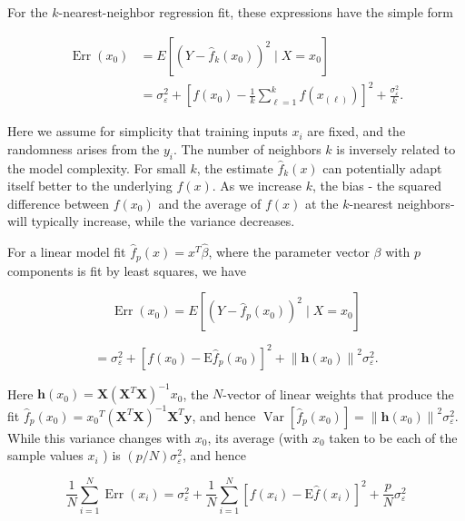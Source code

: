 \documentclass[10pt]{article}
\begin{document}
For the $k$-nearest-neighbor regression fit, these expressions have the simple form


\begin{align*}
\operatorname{Err}\left(x_{0}\right) & =E\left[\left(Y-\hat{f}_{k}\left(x_{0}\right)\right)^{2} \mid X=x_{0}\right] \\
& =\sigma_{\varepsilon}^{2}+\left[f\left(x_{0}\right)-\frac{1}{k} \sum_{\ell=1}^{k} f\left(x_{(\ell)}\right)\right]^{2}+\frac{\sigma_{\varepsilon}^{2}}{k} . \tag{7.10}
\end{align*}


Here we assume for simplicity that training inputs $x_{i}$ are fixed, and the randomness arises from the $y_{i}$. The number of neighbors $k$ is inversely related to the model complexity. For small $k$, the estimate $\hat{f}_{k}(x)$ can potentially adapt itself better to the underlying $f(x)$. As we increase $k$, the bias - the squared difference between $f\left(x_{0}\right)$ and the average of $f(x)$ at the $k$-nearest neighbors-will typically increase, while the variance decreases.

For a linear model fit $\hat{f}_{p}(x)=x^{T} \hat{\beta}$, where the parameter vector $\beta$ with $p$ components is fit by least squares, we have

$$
\operatorname{Err}\left(x_{0}\right)=E\left[\left(Y-\hat{f}_{p}\left(x_{0}\right)\right)^{2} \mid X=x_{0}\right]
$$


\begin{equation*}
=\sigma_{\varepsilon}^{2}+\left[f\left(x_{0}\right)-\mathrm{E} \hat{f}_{p}\left(x_{0}\right)\right]^{2}+\left\|\mathbf{h}\left(x_{0}\right)\right\|^{2} \sigma_{\varepsilon}^{2} . \tag{7.11}
\end{equation*}


Here $\mathbf{h}\left(x_{0}\right)=\mathbf{X}\left(\mathbf{X}^{T} \mathbf{X}\right)^{-1} x_{0}$, the $N$-vector of linear weights that produce the fit $\hat{f}_{p}\left(x_{0}\right)=x_{0}{ }^{T}\left(\mathbf{X}^{T} \mathbf{X}\right)^{-1} \mathbf{X}^{T} \mathbf{y}$, and hence $\operatorname{Var}\left[\hat{f}_{p}\left(x_{0}\right)\right]=\left\|\mathbf{h}\left(x_{0}\right)\right\|^{2} \sigma_{\varepsilon}^{2}$. While this variance changes with $x_{0}$, its average (with $x_{0}$ taken to be each of the sample values $x_{i}$ ) is $(p / N) \sigma_{\varepsilon}^{2}$, and hence


\begin{equation*}
\frac{1}{N} \sum_{i=1}^{N} \operatorname{Err}\left(x_{i}\right)=\sigma_{\varepsilon}^{2}+\frac{1}{N} \sum_{i=1}^{N}\left[f\left(x_{i}\right)-\mathrm{E} \hat{f}\left(x_{i}\right)\right]^{2}+\frac{p}{N} \sigma_{\varepsilon}^{2} \tag{7.12}
\end{equation*}
\end{document}
